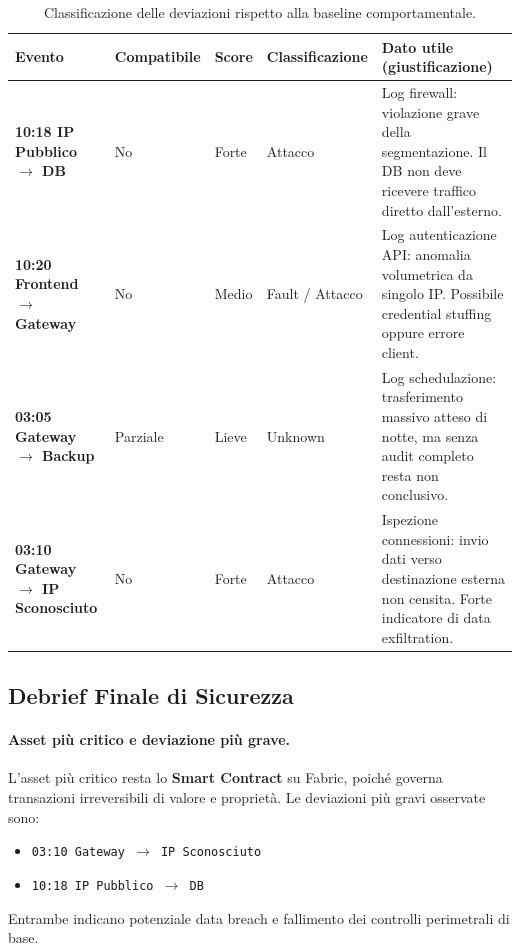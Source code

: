 \documentclass[12pt,a4paper]{article}
\begin{document}
\begin{table}[h]
\centering
\footnotesize
\renewcommand{\arraystretch}{1.4}
\begin{tabularx}{\textwidth}{>{\hsize=0.30\hsize\bfseries}X >{\hsize=0.10\hsize}X >{\hsize=0.10\hsize}X >{\hsize=0.15\hsize}X >{\hsize=0.35\hsize}X}
\toprule
Evento & Compatibile & Score & Classificazione & Dato utile (giustificazione) \\
\midrule
10:18 IP Pubblico \(\rightarrow\) DB & No & Forte & Attacco & Log firewall: violazione grave della segmentazione. Il DB non deve ricevere traffico diretto dall'esterno. \\
10:20 Frontend \(\rightarrow\) Gateway & No & Medio & Fault / Attacco & Log autenticazione API: anomalia volumetrica da singolo IP. Possibile credential stuffing oppure errore client. \\
03:05 Gateway \(\rightarrow\) Backup & Parziale & Lieve & Unknown & Log schedulazione: trasferimento massivo atteso di notte, ma senza audit completo resta non conclusivo. \\
03:10 Gateway \(\rightarrow\) IP Sconosciuto & No & Forte & Attacco & Ispezione connessioni: invio dati verso destinazione esterna non censita. Forte indicatore di data exfiltration. \\
\bottomrule
\end{tabularx}
\caption{Classificazione delle deviazioni rispetto alla baseline comportamentale.}
\end{table}

\newpage

\subsection{Debrief Finale di Sicurezza}
\paragraph{Asset più critico e deviazione più grave.}
L'asset più critico resta lo \textbf{Smart Contract} su Fabric, poiché governa transazioni irreversibili di valore e proprietà.  
Le deviazioni più gravi osservate sono:
\begin{itemize}
    \item \texttt{03:10 Gateway \(\rightarrow\) IP Sconosciuto}
    \item \texttt{10:18 IP Pubblico \(\rightarrow\) DB}
\end{itemize}
Entrambe indicano potenziale data breach e fallimento dei controlli perimetrali di base.
\end{document}
